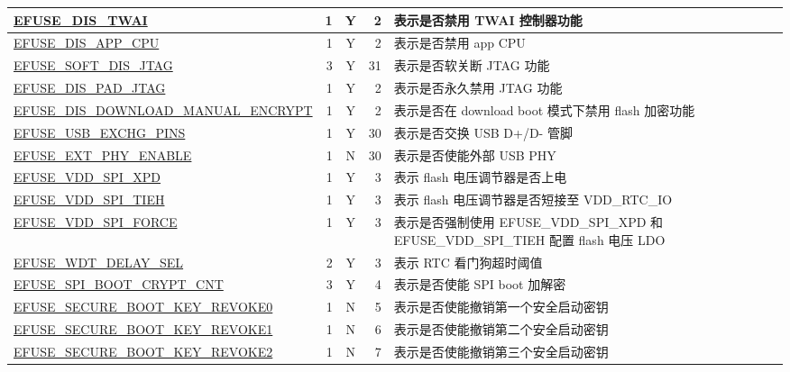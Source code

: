 \begin{longtable}[l]{ |m{8.2cm}|r|c|r|m{9.3cm}| }
    \hline
    \hyperref[fielddesc:EFUSEDISTWAI]{EFUSE\_DIS\_TWAI} & 1 & Y & 2 & 表示是否禁用 TWAI 控制器功能 \\  
    \hline
    \hyperref[fielddesc:EFUSEDISAPPCPU]{EFUSE\_DIS\_APP\_CPU} & 1 & Y & 2 & 表示是否禁用 app CPU \\   
    \hline
    \hyperref[fielddesc:EFUSESOFTDISJTAG]{EFUSE\_SOFT\_DIS\_JTAG} & 3 & Y & 31 & 表示是否软关断 JTAG 功能\\    
    \hline
    \hyperref[fielddesc:EFUSEDISPADJTAG]{EFUSE\_DIS\_PAD\_JTAG} & 1 & Y & 2 & 表示是否永久禁用 JTAG 功能\\   
    \hline
    \hyperref[fielddesc:EFUSEDISDOWNLOADMANUALENCRYPT]{EFUSE\_DIS\_DOWNLOAD\_MANUAL\_ENCRYPT} &  1 & Y & 2 & 表示是否在 download boot 模式下禁用 flash 加密功能\\ 
    \hline
    \hyperref[fielddesc:EFUSEUSBEXCHGPINS]{EFUSE\_USB\_EXCHG\_PINS} & 1 & Y & 30 & 表示是否交换 USB D+/D- 管脚 \\
    \hline
    \hyperref[fielddesc:EFUSEEXTPHYENABLE]{EFUSE\_EXT\_PHY\_ENABLE} & 1 & N & 30 & 表示是否使能外部 USB PHY \\
    \hline
    \hyperref[fielddesc:EFUSEVDDSPIXPD]{EFUSE\_VDD\_SPI\_XPD} & 1 & Y & 3 & 表示 flash 电压调节器是否上电 \\        
    \hline
    \hyperref[fielddesc:EFUSEVDDSPITIEH]{EFUSE\_VDD\_SPI\_TIEH} & 1 & Y & 3 & 表示 flash 电压调节器是否短接至 VDD\_RTC\_IO \\   
    \hline
    \hyperref[fielddesc:EFUSEVDDSPIFORCE]{EFUSE\_VDD\_SPI\_FORCE} & 1 & Y & 3 & 表示是否强制使用 EFUSE\_VDD\_SPI\_XPD 和 EFUSE\_VDD\_SPI\_TIEH 配置 flash 电压 LDO \\ 
    \hline
    \hyperref[fielddesc:EFUSEWDTDELAYSEL]{EFUSE\_WDT\_DELAY\_SEL} & 2 & Y & 3 & 表示 RTC 看门狗超时阈值 \\
    \hline
    \hyperref[fielddesc:EFUSESPIBOOTCRYPTCNT]{EFUSE\_SPI\_BOOT\_CRYPT\_CNT} & 3 & Y & 4 & 表示是否使能 SPI boot 加解密 \\
    \hline
    \hyperref[fielddesc:EFUSESECUREBOOTKEYREVOKE0]{EFUSE\_SECURE\_BOOT\_KEY\_REVOKE0} & 1 & N & 5 & 表示是否使能撤销第一个安全启动密钥 \\
    \hline
    \hyperref[fielddesc:EFUSESECUREBOOTKEYREVOKE1]{EFUSE\_SECURE\_BOOT\_KEY\_REVOKE1} & 1 & N & 6 & 表示是否使能撤销第二个安全启动密钥 \\
    \hline
    \hyperref[fielddesc:EFUSESECUREBOOTKEYREVOKE2]{EFUSE\_SECURE\_BOOT\_KEY\_REVOKE2} & 1 & N & 7 & 表示是否使能撤销第三个安全启动密钥 \\

\end{longtable}
